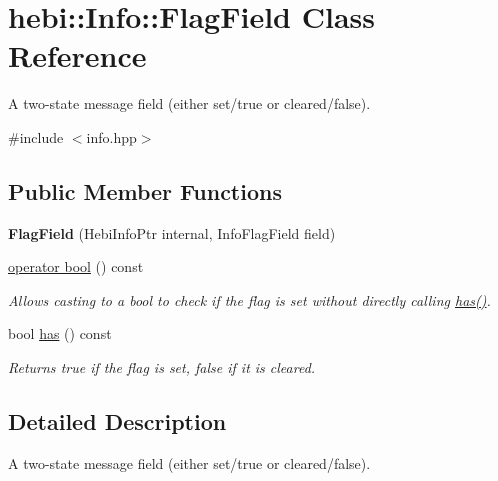 \hypertarget{classhebi_1_1Info_1_1FlagField}{}\section{hebi\+:\+:Info\+:\+:Flag\+Field Class Reference}
\label{classhebi_1_1Info_1_1FlagField}


A two-\/state message field (either set/true or cleared/false).  




{\ttfamily \#include $<$info.\+hpp$>$}

\subsection*{Public Member Functions}
\begin{DoxyCompactItemize}
\item 
{\bfseries Flag\+Field} (Hebi\+Info\+Ptr internal, Info\+Flag\+Field field)\hypertarget{classhebi_1_1Info_1_1FlagField_a2c779f542b33a5ac7dbd020b6a56bccf}{}\label{classhebi_1_1Info_1_1FlagField_a2c779f542b33a5ac7dbd020b6a56bccf}

\item 
\hyperlink{classhebi_1_1Info_1_1FlagField_a14b2e23f77976afe5defcef5c00eb7aa}{operator bool} () const 
\begin{DoxyCompactList}\small\item\em Allows casting to a bool to check if the flag is set without directly calling {\ttfamily \hyperlink{classhebi_1_1Info_1_1FlagField_a497aad19d402401c286eba2db9d86d5e}{has()}}. \end{DoxyCompactList}\item 
bool \hyperlink{classhebi_1_1Info_1_1FlagField_a497aad19d402401c286eba2db9d86d5e}{has} () const \hypertarget{classhebi_1_1Info_1_1FlagField_a497aad19d402401c286eba2db9d86d5e}{}\label{classhebi_1_1Info_1_1FlagField_a497aad19d402401c286eba2db9d86d5e}

\begin{DoxyCompactList}\small\item\em Returns {\ttfamily true} if the flag is set, false if it is cleared. \end{DoxyCompactList}\end{DoxyCompactItemize}


\subsection{Detailed Description}
A two-\/state message field (either set/true or cleared/false). 

